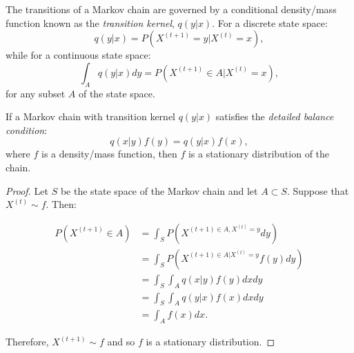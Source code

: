 \begin{definition}
The transitions of a Markov chain are governed by a conditional density/mass function known as the {\it transition kernel}, $q(y|x)$. For a discrete state space:
\begin{equation}
q(y|x)=P(X^{(t+1)}=y|X^{(t)}=x),
\end{equation}
while for a continuous state space:
\begin{equation}
\int_Aq(y|x)dy=P(X^{(t+1)}\in A|X^{(t)}=x),
\end{equation}
for any subset $A$ of the state space.
\end{definition}

\begin{prop}If a Markov chain with transition kernel $q(y|x)$ satisfies the {\it detailed balance condition}:
\begin{equation}
q(x|y)f(y)=q(y|x)f(x),
\end{equation}
where $f$ is a density/mass function, then $f$ is a stationary distribution of the chain.

\begin{proof}
Let $S$ be the state space of the Markov chain and let $A\subset S$. Suppose that $X^{(t)}\sim f$. Then:

\begin{displaymath}
\begin{split}
P(X^{(t+1)}\in A)&=\int_S P(X^{(t+1)\in A, X^{(t)}=y}dy)\\
&=\int_S P(X^{(t+1)\in A| X^{(t)}=y}f(y)dy)\\
&=\int_S\int_A q(x|y)f(y)dxdy\\
&=\int_S\int_A q(y|x)f(x)dxdy\\
&=\int_Af(x)dx.
\end{split}
\end{displaymath} 

Therefore, $X^{(t+1)}\sim f$ and so $f$ is a stationary distribution.
\end{proof}
\end{prop}

